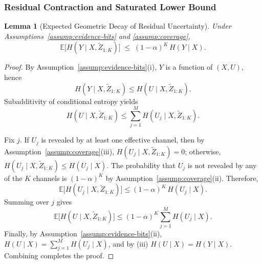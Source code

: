 \documentclass{article}
\theoremstyle{plain}
\newtheorem{lemma}[theorem]{Lemma}
\theoremstyle{definition}
\theoremstyle{remark}
\newcommand{\EE}{\mathbb{E}}
\begin{document}
\subsubsection{Residual Contraction and Saturated Lower Bound}
\label{app:residual}

\begin{lemma}[Expected Geometric Decay of Residual Uncertainty]
\label{lem:residual}
Under Assumptions~\ref{assump:evidence-bits} and \ref{assump:coverage},
\begin{equation}
\EE\big[H(Y\mid X,\tilde Z_{1:K})\big]
\;\le\;
(1-\alpha)^K\,H(Y\mid X).
\label{eq:residual-decay-exp}
\end{equation}
\end{lemma}

\begin{proof}
By Assumption~\ref{assump:evidence-bits}(i), $Y$ is a function of $(X,U)$, hence
\begin{equation}
H(Y\mid X,\tilde Z_{1:K})
\le
H(U\mid X,\tilde Z_{1:K}).
\end{equation}
Subadditivity of conditional entropy yields
\begin{equation}
H(U\mid X,\tilde Z_{1:K})
\le
\sum_{j=1}^M H(U_j\mid X,\tilde Z_{1:K}).
\end{equation}

Fix $j$. If $U_j$ is revealed by at least one effective channel, then by
Assumption~\ref{assump:coverage}(iii),
$H(U_j\mid X,\tilde Z_{1:K})=0$; otherwise,
$H(U_j\mid X,\tilde Z_{1:K})\le H(U_j\mid X)$.
The probability that $U_j$ is not revealed by any of the $K$ channels is $(1-\alpha)^K$
by Assumption~\ref{assump:coverage}(ii). Therefore,
\begin{equation}
\EE\big[H(U_j\mid X,\tilde Z_{1:K})\big]
\le
(1-\alpha)^K\,H(U_j\mid X).
\end{equation}
Summing over $j$ gives
\begin{equation}
\EE\big[H(U\mid X,\tilde Z_{1:K})\big]
\le
(1-\alpha)^K \sum_{j=1}^M H(U_j\mid X).
\end{equation}
Finally, by Assumption~\ref{assump:evidence-bits}(ii),
$H(U\mid X)=\sum_{j=1}^M H(U_j\mid X)$, and by (iii) $H(U\mid X)=H(Y\mid X)$.
Combining completes the proof.
\end{proof}
\end{document}
